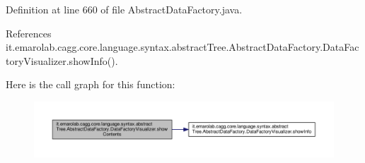 Definition at line 660 of file Abstract\-Data\-Factory.\-java.



References it.\-emarolab.\-cagg.\-core.\-language.\-syntax.\-abstract\-Tree.\-Abstract\-Data\-Factory.\-Data\-Factory\-Visualizer.\-show\-Info().



Here is the call graph for this function\-:\nopagebreak
\begin{figure}[H]
\begin{center}
\leavevmode
\includegraphics[width=350pt]{classit_1_1emarolab_1_1cagg_1_1core_1_1language_1_1syntax_1_1abstractTree_1_1AbstractDataFactory_1_1DataFactoryVisualizer_ae2b22ac68cd928fcd34ee6566d1d15c5_cgraph}
\end{center}
\end{figure}


